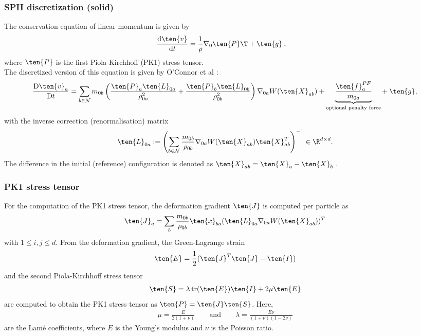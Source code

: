 \begin{frame}
    \frametitle{SPH discretization (solid)}

    The conservation equation of linear momentum is given by
    \begin{align}
        \frac{\mathrm{d} \ten{v}}{\mathrm{d}t} & = \frac{1}{\rho} \nabla_0 \ten{P}\T +
        \ten{g} \: ,
        \label{conservation momentum}
    \end{align}
    where $\ten{P}$ is the first Piola-Kirchhoff (PK1) stress tensor. \\
    \vspace*{0.5cm}
    The discretized version of this equation is given by O'Connor et al
    \cite{O_Connor_2021}:
    \begin{align}
        \td{\ten{v}_a}{t} = \sum_{b\in \mathcal{N}} m_{0b}
        \left( \frac{\ten{P}_a \ten{L}_{0a}}{\rho_{0a}^2} + \frac{\ten{P}_b
            \ten{L}_{0b}}{\rho_{0b}^2} \right)
        \nabla_{0a} W(\ten{X}_{ab}) +
        \underbrace{\frac{\ten{f}_a^{PF}}{m_{0a}}}_{\text{optional penalty force}} + \:
        \ten{g},
    \end{align}
    with the inverse correction (renormalisation) matrix
    \begin{align}
        \ten{L}_{0a} := \left( \sum_{b \in \mathcal{N}} \frac{m_{0b}}{\rho_{0b}}
        \nabla_{0a}
        W(\ten{X}_{ab}) \ten{X}_{ab}^T \right)^{-1} \in \R^{d \times d}.
    \end{align}
    The difference in the initial (reference) configuration is denoted as $\ten{X}_{ab}
        = \ten{X}_a - \ten{X}_b$ .
\end{frame}

\begin{frame}
    \frametitle{PK1 stress tensor}
    For the computation of the PK1 stress tensor, the deformation gradient $\ten{J}$ is
    computed per particle as
    \begin{align}
        \ten{J}_a = \sum_b \frac{m_{0b}}{\rho_{0b}} \ten{x}_{ba} (\ten{L}_{0a}\nabla_{0a}
        W(\ten{X}_{ab}))^T
    \end{align}
    with $1 \leq i,j \leq d$.
    From the deformation gradient, the Green-Lagrange strain
    \begin{align}
        \ten{E} = \frac{1}{2}(\ten{J}^T\ten{J} - \ten{I})
    \end{align}
    and the second Piola-Kirchhoff stress tensor
    \begin{align}
        \ten{S} = \lambda \operatorname{tr}(\ten{E}) \ten{I} + 2\mu \ten{E}
    \end{align}
    are computed to obtain the PK1 stress tensor as $\ten{P} = \ten{J}\ten{S}$.
    Here,
    \begin{align}
        \mu = \frac{E}{2(1 + \nu)}\qquad \text{and} \qquad \lambda = \frac{E\nu}{(1 +
            \nu)(1 -
            2\nu)}
    \end{align}
    are the Lamé coefficients, where $E$ is the Young's modulus and $\nu$ is the Poisson
    ratio.

\end{frame}
